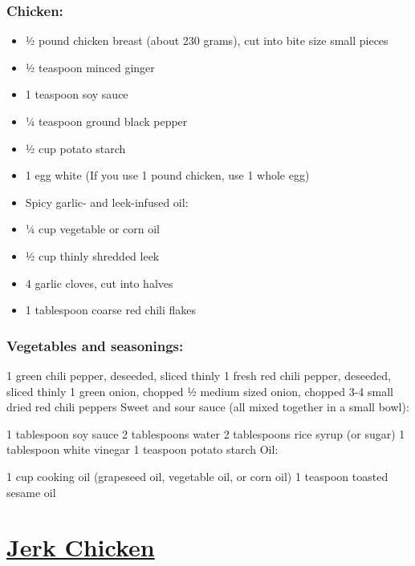 \documentclass[
]{article}
\begin{document}
\hypertarget{chicken}{%
\subsubsection{Chicken:}\label{chicken}}

\begin{itemize}
\item
  ½ pound chicken breast (about 230 grams), cut into bite size small pieces
\item
  ½ teaspoon minced ginger
\item
  1 teaspoon soy sauce
\item
  ¼ teaspoon ground black pepper
\item
  ½ cup potato starch
\item
  1 egg white (If you use 1 pound chicken, use 1 whole egg)
\item
  Spicy garlic- and leek-infused oil:
\item
  ¼ cup vegetable or corn oil
\item
  ½ cup thinly shredded leek
\item
  4 garlic cloves, cut into halves
\item
  1 tablespoon coarse red chili flakes
\end{itemize}

\hypertarget{vegetables-and-seasonings}{%
\subsubsection{Vegetables and seasonings:}\label{vegetables-and-seasonings}}

1 green chili pepper, deseeded, sliced thinly
1 fresh red chili pepper, deseeded, sliced thinly
1 green onion, chopped
½ medium sized onion, chopped
3-4 small dried red chili peppers
Sweet and sour sauce (all mixed together in a small bowl):

1 tablespoon soy sauce
2 tablespoons water
2 tablespoons rice syrup (or sugar)
1 tablespoon white vinegar
1 teaspoon potato starch
Oil:

1 cup cooking oil (grapeseed oil, vegetable oil, or corn oil)
1 teaspoon toasted sesame oil

\hypertarget{jerk-chicken}{%
\section{\texorpdfstring{\href{https://www.seriouseats.com/recipes/2013/08/jerk-chicken.html}{Jerk Chicken}}{Jerk Chicken}}\label{jerk-chicken}}
\end{document}
